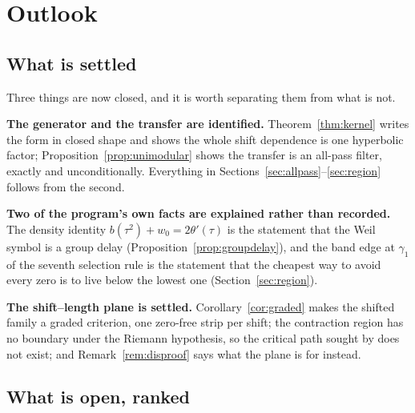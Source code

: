 \section{Outlook}\label{sec:outlook}

\subsection{What is settled}

Three things are now closed, and it is worth separating them from what is not.

\textbf{The generator and the transfer are identified.}
Theorem~\ref{thm:kernel} writes the form in closed shape and shows the whole
shift dependence is one hyperbolic factor; Proposition~\ref{prop:unimodular}
shows the transfer is an all-pass filter, exactly and unconditionally. Everything
in Sections~\ref{sec:allpass}--\ref{sec:region} follows from the second.

\textbf{Two of the program's own facts are explained rather than recorded.} The
density identity $b(\tau^2)+w_0=2\theta'(\tau)$ is the statement that the Weil
symbol is a group delay (Proposition~\ref{prop:groupdelay}), and the band edge at
$\gamma_1$ of the seventh selection rule is the statement that the cheapest way
to avoid every zero is to live below the lowest one (Section~\ref{sec:region}).

\textbf{The shift--length plane is settled.} Corollary~\ref{cor:graded} makes the
shifted family a graded criterion, one zero-free strip per shift; the contraction
region has no boundary under the Riemann hypothesis, so the critical path sought
by \cite{CriticalPath} does not exist; and Remark~\ref{rem:disproof} says what
the plane is for instead.

\subsection{What is open, ranked}

